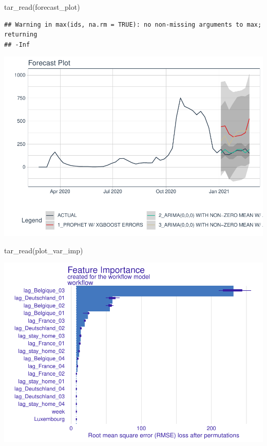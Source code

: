 \documentclass{article}
\newenvironment{Shaded}{\begin{snugshade}}{\end{snugshade}}
\newcommand{\FunctionTok}[1]{\textcolor[rgb]{0.00,0.00,0.00}{#1}}
\newcommand{\NormalTok}[1]{#1}
\begin{document}
\begin{Shaded}
\begin{Highlighting}[]
\FunctionTok{tar\_read}\NormalTok{(forecast\_plot)}
\end{Highlighting}
\end{Shaded}

\begin{verbatim}
## Warning in max(ids, na.rm = TRUE): no non-missing arguments to max; returning
## -Inf
\end{verbatim}

\includegraphics{paper_files/figure-latex/unnamed-chunk-7-1.pdf}

\begin{Shaded}
\begin{Highlighting}[]
\FunctionTok{tar\_read}\NormalTok{(plot\_var\_imp)}
\end{Highlighting}
\end{Shaded}

\includegraphics{paper_files/figure-latex/unnamed-chunk-8-1.pdf}
\end{document}

